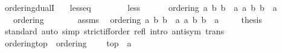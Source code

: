 \begin{isabellebody}
\isamarkupfalse%
%
\endisatagproof
{\isafoldproof}%
%
\isadelimproof
\isanewline
%
\endisadelimproof
\isanewline
{}\isamarkupfalse%
\ ordering{\isacharunderscore}{\kern0pt}dualI{\isacharcolon}{\kern0pt}\isanewline
\ \ \ less{\isacharunderscore}{\kern0pt}eq\ {\isacharparenleft}{\kern0pt}\ {\isacartoucheopen}\isactrlbold {\isasymle}{\isacartoucheclose}\ {}{}{\isacharparenright}{\kern0pt}\isanewline
\ \ \ \ \ less\ {\isacharparenleft}{\kern0pt}\ {\isacartoucheopen}\isactrlbold {\isacharless}{\kern0pt}{\isacartoucheclose}\ {}{}{\isacharparenright}{\kern0pt}\isanewline
\ \ \ {\isacartoucheopen}ordering\ {\isacharparenleft}{\kern0pt}{\isasymlambda}a\ b{\isachardot}{\kern0pt}\ b\ \isactrlbold {\isasymle}\ a{\isacharparenright}{\kern0pt}\ {\isacharparenleft}{\kern0pt}{\isasymlambda}a\ b{\isachardot}{\kern0pt}\ b\ \isactrlbold {\isacharless}{\kern0pt}\ a{\isacharparenright}{\kern0pt}{\isacartoucheclose}\isanewline
\ \ \ {\isacartoucheopen}ordering\ {\isacharparenleft}{\kern0pt}\isactrlbold {\isasymle}{\isacharparenright}{\kern0pt}\ {\isacharparenleft}{\kern0pt}\isactrlbold {\isacharless}{\kern0pt}{\isacharparenright}{\kern0pt}{\isacartoucheclose}\isanewline
%
\isadelimproof
%
\endisadelimproof
%
\isatagproof
{}\isamarkupfalse%
\ {\isacharminus}{\kern0pt}\isanewline
\ \ \isamarkupfalse%
\ assms\ \isamarkupfalse%
\ ordering\ {\isacartoucheopen}{\isasymlambda}a\ b{\isachardot}{\kern0pt}\ b\ \isactrlbold {\isasymle}\ a{\isacartoucheclose}\ {\isacartoucheopen}{\isasymlambda}a\ b{\isachardot}{\kern0pt}\ b\ \isactrlbold {\isacharless}{\kern0pt}\ a{\isacartoucheclose}\ \isacommand{{\isachardot}{\kern0pt}}\isamarkupfalse%
\isanewline
\ \ \isamarkupfalse%
\ {\isacharquery}{\kern0pt}thesis\isanewline
\ \ \ \ \isamarkupfalse%
\ standard\ {\isacharparenleft}{\kern0pt}auto\ simp{\isacharcolon}{\kern0pt}\ strict{\isacharunderscore}{\kern0pt}iff{\isacharunderscore}{\kern0pt}order\ refl\ intro{\isacharcolon}{\kern0pt}\ antisym\ trans{\isacharparenright}{\kern0pt}\isanewline
{}\isamarkupfalse%
%
\endisatagproof
{\isafoldproof}%
%
\isadelimproof
\isanewline
%
\endisadelimproof
\isanewline
{}\isamarkupfalse%
\ ordering{\isacharunderscore}{\kern0pt}top\ {\isacharequal}{\kern0pt}\ ordering\ {\isacharplus}{\kern0pt}\isanewline
\ \ \ top\ {\isacharcolon}{\kern0pt}{\isacharcolon}{\kern0pt}\ {\isacartoucheopen}{\isacharprime}{\kern0pt}a{\isacartoucheclose}\ \ {\isacharparenleft}{\kern0pt}{\isacartoucheopen}\isactrlbold {\isasymtop}{\isacartoucheclose}{\isacharparenright}{\kern0pt}\isanewline

\end{isabellebody}
